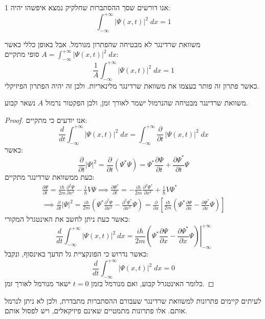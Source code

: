 \documentclass{tstextbook}
\begin{document}
\begin{definition}[נרמול]
אנו דורשים שסך ההסתברות שחלקיק נמצא איפשהו יהיה 1:
$$\int_{-\infty}^{+\infty}|\Psi(x,t)|^{2}\;d x=1$$

\end{definition}
\begin{proposition}
משוואת שרדינגר לא מבטיחה שהפתרון מנורמל. אבל באופן כללי כאשר \(A=\int_{-\infty}^{+\infty}|\Psi(x,t)|^{2}\;d x\) סופי מתקיים:
$$\frac{1}{A}\int_{-\infty}^{+\infty}|\Psi(x,t)|^{2}\;d x=1$$
כאשר פתרון זה פותר בעצמו את משוואת שרדינגר מלינאריות. ולכן זה יהיה הפתרון הפיזיקלי.

\end{proposition}
\begin{proposition}
משוואת שרדינגר מבטיחה שהנרמול ישמר לאורך זמן, ולכן הפקטור נרמול \(A\) נשאר קבוע.

\end{proposition}
\begin{proof}
אנו יודעים כי מתקיים:
$${\frac{d}{d t}}\int_{-\infty}^{+\infty}|\Psi(x,t)|^{2}\;d x=\int_{-\infty}^{+\infty}{\frac{\partial}{\partial t}}\,|\Psi(x,t)|^{2}\;d x$$
כאשר:
$${\frac{\partial}{\partial t}}\left|\Psi\right|^{2}={\frac{\partial}{\partial t}}\left(\Psi^{*}\Psi\right)=\Psi^{*}{\frac{\partial\Psi}{\partial t}}+{\frac{\partial\Psi^{*}}{\partial t}}\Psi$$
כעת ממשוואת שרדינגר מתקיים:
\begin{gather*}{\frac{\partial\Psi}{\partial t}}={\frac{i\hbar}{2m}}{\frac{\partial^{2}\Psi}{\partial x^{2}}}-{\frac{i}{\hbar}}V\Psi \implies{\frac{\partial\Psi^{*}}{\partial t}}=-{\frac{i\hbar}{2m}}{\frac{\partial^{2}\Psi^{*}}{\partial x^{2}}}+{\frac{i}{\hbar}}V\Psi^{*}  \\\implies {\frac{\partial}{\partial t}}\left|\Psi\right|^{2}={\frac{i\hbar}{2m}}\left(\Psi^{*}{\frac{\partial^{2}\Psi}{\partial x^{2}}}-{\frac{\partial^{2}\Psi^{*}}{\partial x^{2}}}\Psi\right)={\frac{\partial}{\partial x}}\left[{\frac{i\hbar}{2m}}\left(\Psi^{*}{\frac{\partial\Psi}{\partial x}}-{\frac{\partial\Psi^{*}}{\partial x}}\Psi\right)\right]
\end{gather*}
כאשר כעת ניתן לחשב את האינטגרל המקורי:
$$\frac{d}{d t}\int_{-\infty}^{+\infty}|\Psi(x,t)|^{2}\ d x=\frac{i\hbar}{2m}\left.\left(\Psi^{*}\frac{\partial\Psi}{\partial x}-\frac{\partial\Psi^{*}}{\partial x}\Psi\right)\right|_{-\infty}^{+\infty}$$
כאשר נדרוש כי הפונקציית גל תדעך באינסוף, ונקבל:
$$\frac{d}{d t}\int_{-\infty}^{+\infty}|\Psi(x,t)|^{2}\;d x=0$$
כלומר האינטגרל קבוע, ואם מנורמל בזמן \(t=0\) ישאר מנורמל לאורך זמן.

\end{proof}
\begin{remark}
לעיתים קיימים פתרונות למשוואת שרדינגר שעבורם ההסתברות מתבדרת, ולכן לא ניתן לנרמל אותם. אלו פתרונות מתמטיים שאינם פיזיקאלים, ויש לפסול אותם.

\end{remark}
\end{document}
